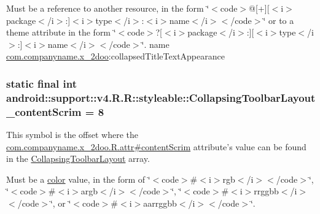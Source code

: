 Must be a reference to another resource, in the form \char`\"{}$<$code$>$@\mbox{[}+\mbox{]}\mbox{[}$<$i$>$package$<$/i$>$:\mbox{]}$<$i$>$type$<$/i$>$:$<$i$>$name$<$/i$>$$<$/code$>$\char`\"{} or to a theme attribute in the form \char`\"{}$<$code$>$?\mbox{[}$<$i$>$package$<$/i$>$:\mbox{]}\mbox{[}$<$i$>$type$<$/i$>$:\mbox{]}$<$i$>$name$<$/i$>$$<$/code$>$\char`\"{}.  name \hyperlink{namespacecom_1_1companyname_1_1x__2doo}{com.companyname.x\_\-2doo}:collapsedTitleTextAppearance \hypertarget{classandroid_1_1support_1_1v4_1_1_r_1_1styleable_060f29f1813e3c34f37be84c9cad4fcd}{
\subsubsection[{CollapsingToolbarLayout\_\-contentScrim}]{\setlength{\rightskip}{0pt plus 5cm}static final int android::support::v4.R.R::styleable::CollapsingToolbarLayout\_\-contentScrim = 8}}
\label{classandroid_1_1support_1_1v4_1_1_r_1_1styleable_060f29f1813e3c34f37be84c9cad4fcd}


This symbol is the offset where the \hyperlink{classcom_1_1companyname_1_1x__2doo_1_1_r_1_1attr_e4754d34ad709f02c62ccf9c0aad2861}{com.companyname.x\_\-2doo.R.attr\#contentScrim} attribute's value can be found in the \hyperlink{classandroid_1_1support_1_1v4_1_1_r_1_1styleable_aa101903fcf4b45a3b7fee0a0abc5ea8}{CollapsingToolbarLayout} array.

Must be a \hyperlink{classandroid_1_1support_1_1v4_1_1_r_1_1color}{color} value, in the form of \char`\"{}$<$code$>$\#$<$i$>$rgb$<$/i$>$$<$/code$>$\char`\"{}, \char`\"{}$<$code$>$\#$<$i$>$argb$<$/i$>$$<$/code$>$\char`\"{}, \char`\"{}$<$code$>$\#$<$i$>$rrggbb$<$/i$>$$<$/code$>$\char`\"{}, or \char`\"{}$<$code$>$\#$<$i$>$aarrggbb$<$/i$>$$<$/code$>$\char`\"{}. 

